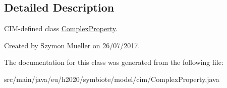 \subsection{Detailed Description}
C\+I\+M-\/defined class \hyperlink{classeu_1_1h2020_1_1symbiote_1_1model_1_1cim_1_1ComplexProperty}{Complex\+Property}.

Created by Szymon Mueller on 26/07/2017. 

The documentation for this class was generated from the following file\+:\begin{DoxyCompactItemize}
\item 
src/main/java/eu/h2020/symbiote/model/cim/Complex\+Property.\+java\end{DoxyCompactItemize}
